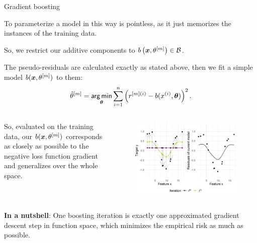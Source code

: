 \begin{vbframe}{Gradient boosting}
\begin{footnotesize}


To parameterize a model in this way is pointless,
as it just memorizes the instances of the training data.

\vspace*{0.3cm}


So, we restrict our additive components to $b\left(\bm{x}, \theta^{[m]}\right) \in \mathcal{B}$.


The pseudo-residuals are calculated exactly as stated above,
then we fit a simple model $b(\bm{x}, \theta^{[m]})$ to them:
$$ \hat{\theta}^{[m]} = \mathop{\sf arg\,min}_{\bm{\theta}} \sum_{i=1}^n \left(r^{[m](i)} - b(x^{(i)}, \bm{\theta})\right)^2. $$

\lz

\begin{columns}
\column{5cm}
So, evaluated on the training data,
our $b(\bm{x}, \theta^{[m]})$ corresponds as closely as possible to the negative
loss function gradient and generalizes over the whole space.


\column{5cm}
\vspace*{-1cm}
\begin{figure}[th]
  \includegraphics[width=\textwidth]{figure/fig-gb-concept-idea.png}
\end{figure}


\end{columns}
\end{footnotesize}

\framebreak
\begin{footnotesize}
\textbf{In a nutshell}: One boosting iteration is exactly one approximated gradient descent step in function space,
which minimizes the empirical risk as much as possible.



\end{footnotesize}
\end{vbframe}

